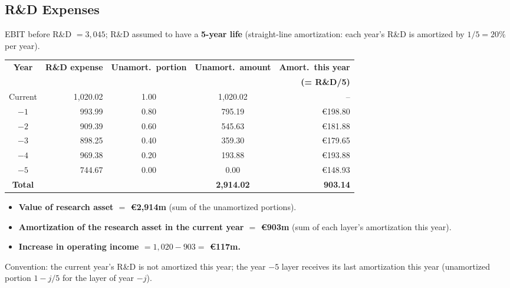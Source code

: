 \subsection{R\&D Expenses}

\begin{center}
\end{center}

\begin{exbox}
EBIT before R\&D $=3{,}045$; R\&D assumed to have a \textbf{5-year life} (straight-line amortization: each year's R\&D is amortized by $1/5=20\%$ per year).
\begin{center}
\small
\begin{tabular}{@{}crccr@{}}
\toprule
\textbf{Year} & \textbf{R\&D expense} & \textbf{Unamort.\ portion} & \textbf{Unamort.\ amount} & \textbf{Amort.\ this year}\\
& & & & \textbf{(= R\&D/5)}\\
\midrule
Current & 1,020.02 & 1.00 & 1,020.02 & --\\
$-1$ & 993.99 & 0.80 & 795.19 & \euro198.80\\
$-2$ & 909.39 & 0.60 & 545.63 & \euro181.88\\
$-3$ & 898.25 & 0.40 & 359.30 & \euro179.65\\
$-4$ & 969.38 & 0.20 & 193.88 & \euro193.88\\
$-5$ & 744.67 & 0.00 & 0.00 & \euro148.93\\
\midrule
\textbf{Total} & & & \textbf{2,914.02} & \textbf{903.14}\\
\bottomrule
\end{tabular}
\end{center}
\begin{itemize}
  \item \textbf{Value of research asset $=$ \euro2,914m} (sum of the unamortized portions).
  \item \textbf{Amortization of the research asset in the current year $=$ \euro903m} (sum of each layer's amortization this year).
  \item \textbf{Increase in operating income $=1{,}020-903=$ \euro117m.}
\end{itemize}
\added Convention: the current year's R\&D is not amortized this year; the year $-5$ layer receives its last amortization this year (unamortized portion $1-j/5$ for the layer of year $-j$).
\end{exbox}

